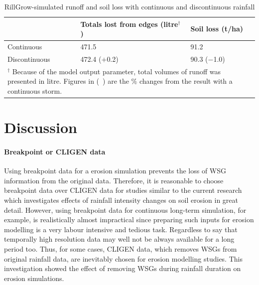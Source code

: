 \begin{table}[htbp]
  \centering
  \caption{RillGrow-simulated runoff and soil loss with continuous and
discontinuous rainfall}
  \label{tab:RillGrowRunoffAndSoilLossWithContAndDiscontRainfall}
    \begin{tabular}{lll}
      \toprule
  & Totals lost from edges (litre$^\dagger$) & Soil loss (t/ha) \\
      \midrule
      Continuous & 471.5 & 91.2 \\
      Discontinuous & 472.4 ($+$0.2)& 90.3 ($-$1.0)\\
      \bottomrule
      \multicolumn{3}{p{11cm}}{\footnotesize $^\dagger$ Because of the model
output parameter, total volumes of runoff was presented in litre. Figures in (\
) are the \% changes from the result with a continuous storm.}
    \end{tabular}
\end{table}

\section{Discussion}
\label{sec:InterStormPeriodsWithinAStormDiscussion}

\paragraph{Breakpoint or CLIGEN data} Using breakpoint data for a erosion
simulation prevents the loss of WSG information from the original data.
Therefore, it is reasonable to choose breakpoint data over CLIGEN data for
studies similar to the current research which investigates effects of rainfall
intensity changes on soil erosion in great detail. However, using breakpoint
data for continuous long-term simulation, for example, is realistically almost
impractical since preparing such inputs for erosion modelling is a very labour
intensive and tedious task. Regardless to say that temporally high resolution
data may well not be always available for a long period too. Thus, for some
cases, CLIGEN data, which removes WSGs from original rainfall data, are
inevitably chosen for erosion modelling studies. This investigation showed the
effect of removing WSGs during rainfall duration on erosion simulations.

